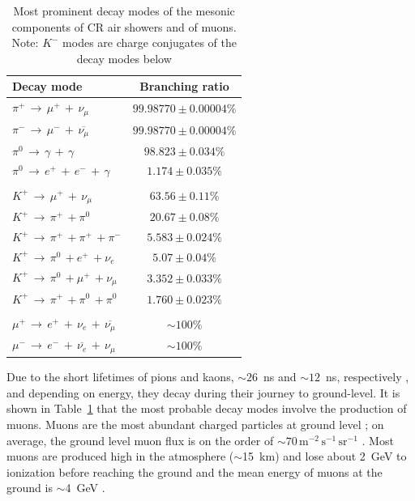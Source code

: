 \begin{table}[ht!]
	\begin{center}
		\caption{ Most prominent decay modes of the mesonic components of CR air showers and of muons. Note: $K^-$ modes are charge conjugates of the decay modes below \citep{particle_data_group_review_2020}}
		\label{tab:meson_decay}
		\begin{tabular}{lc}
			\hline
			Decay mode & Branching ratio  \\
			\hline
			{$ \pi^{+} \, \rightarrow \, \mu^{+} \, + \, \nu_{\mu} $}	 &  $99.98770 \pm 0.00004 \%$ \\
			{$ \pi^{-} \, \rightarrow \, \mu^{-} \, + \, \overline{\nu_{\mu}} $}  &  $99.98770 \pm 0.00004 \% $ \\
			{$ \pi^{0} \, \rightarrow \, \gamma \, + \, \gamma $} &  $98.823 \pm 0.034 \% $ \\
			{$ \pi^{0} \, \rightarrow \, e^+ \, + \, e^-  \, + \, \gamma $} &  $1.174 \pm 0.035 \% $ \\
			{}  & {} \\
			{$K^+ \, \rightarrow \, \mu^{+} \, + \, \nu_{\mu}$}  &  $63.56 \pm 0.11 \% $ \\
			{$K^+ \, \rightarrow \, \pi^{+} \, + \pi^{0} $}  &  $20.67 \pm 0.08 \% $ \\
			{$K^+ \, \rightarrow \, \pi^{+} \, + \pi^{+} \, + \pi^{-}$}  &  $5.583 \pm 0.024 \% $ \\
			{$K^+ \, \rightarrow \, \pi^{0} \, + e^{+} \, + \nu_{e}$}  & $5.07 \pm 0.04 \% $ \\ 		 		 		 		
			{$K^+ \, \rightarrow \, \pi^{0} \, + \mu^{+} \, + \nu_{\mu}$}  &  $3.352 \pm 0.033 \% $\\ 		 		 		 		
			{$K^+ \, \rightarrow \, \pi^{+} \, + \pi^{0} \, + \pi^{0}$}  &  $1.760 \pm 0.023 \% $\\
			{}  & {} \\
			{$ \mu^{+} \, \rightarrow \, e^{+} \, + \, \nu_e \, + \, \overline{\nu_{\mu}} $}  &  $\sim 100\%$\\	
			{$ \mu^{-} \, \rightarrow \, e^{-} \, + \, \overline{\nu_e} \, + \, \nu_{\mu} $}  &  $\sim 100\%$\\	
			\hline
		\end{tabular}
	\end{center}
\end{table}


Due to the short lifetimes of pions and kaons, $\sim26$~ns and $\sim12$~ns, respectively \citep{particle_data_group_review_2020}, and depending on energy, they decay during their journey to ground-level. It is shown in Table~\ref{tab:meson_decay} that the most probable decay modes involve the production of muons. Muons are the most abundant charged particles at ground level \citep{particle_data_group_review_2020}; on average, the ground level muon flux is on the order of $\sim 70 \, \mathrm{m}^{-2}\,\mathrm{s}^{-1}\,\mathrm{sr}^{-1}$ \citep{cecchini_cosmic_2000, blackmore_terrestrial_2015, pereira_ground-level_2021, particle_data_group_review_2020}. Most muons are produced high in the atmosphere ($\sim$15~km) and lose about 2~GeV to ionization before reaching the ground and the mean energy of muons at the ground is $\sim$4~GeV \citep{particle_data_group_review_2020}.

